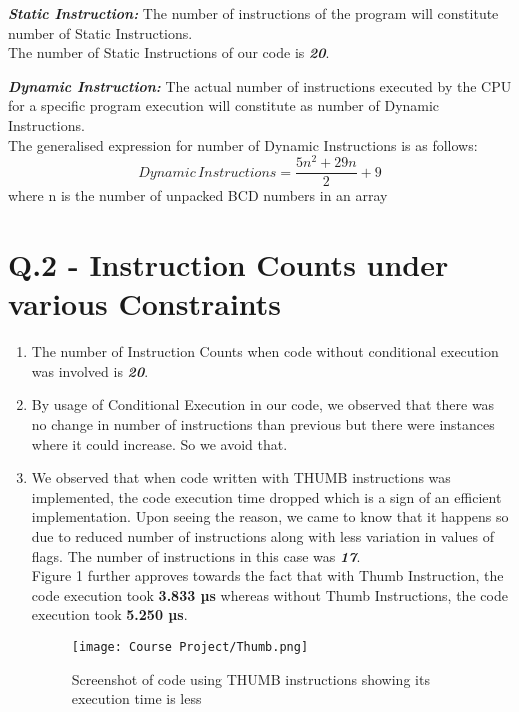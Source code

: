 \documentclass[12pt]{article}
\begin{document}
\textbf{\textit{Static Instruction:}} The number of instructions of the program will constitute number of Static Instructions. \\
The number of Static Instructions of our code is \textbf{\textit{20}}.

\textbf{\textit{Dynamic Instruction:}} The actual number of instructions executed by the CPU for a specific program execution will constitute as number of Dynamic Instructions. \\

The generalised expression for number of Dynamic Instructions is as follows: \\
\begin{equation*}
    Dynamic \, Instructions = \frac{5n^{2} + 29n}{2} + 9
\end{equation*}
where n is the number of unpacked BCD numbers in an array


\section{Q.2 - Instruction Counts under various Constraints}
\begin{enumerate}[label=(\alph*)]
    \item The number of Instruction Counts when code without conditional execution was involved is \textbf{\textit{20}}.
    \item By usage of Conditional Execution in our code, we observed that there was no change in number of instructions than previous but there were instances where it could increase. So we avoid that.
    \item We observed that when code written with THUMB instructions was implemented, the code execution time dropped which is a sign of an efficient implementation. Upon seeing the reason, we came to know that it happens so due to reduced number of instructions along with less variation in values of flags.
    The number of instructions in this case was \textbf{\textit{17}}. \\
    
    Figure 1 further approves towards the fact that with Thumb Instruction, the code execution took \textbf{3.833 µs} whereas without Thumb Instructions, the code execution took \textbf{5.250 µs}.
    \begin{center}
    \begin{figure}
        \centering
        \texttt{[image: Course Project/Thumb.png]}
        \caption{Screenshot of code using THUMB instructions showing its execution time is less}
    \end{figure}
\end{center}
    
\end{enumerate}
\end{document}

